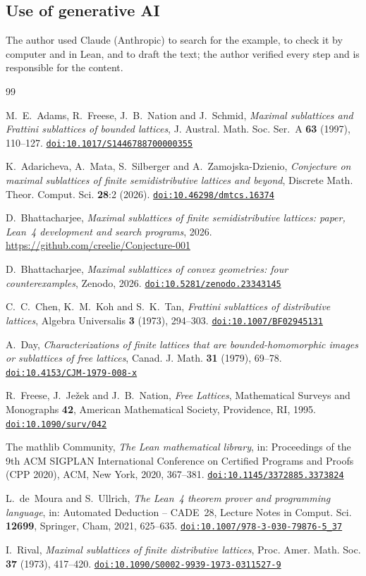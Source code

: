 \documentclass[11pt]{amsart}
\theoremstyle{definition}
\theoremstyle{remark}
\numberwithin{equation}{section}
\newcommand{\doi}[1]{\href{https://doi.org/#1}{\nolinkurl{doi:#1}}}
\begin{document}
\subsection*{Use of generative AI}
The author used Claude (Anthropic) to search for the example, to check it by computer and in Lean, and to draft the text; the author verified every step and is responsible for the content.

\begin{thebibliography}{99}

M.~E.~Adams, R.~Freese, J.~B.~Nation and J.~Schmid, \emph{Maximal sublattices and Frattini sublattices of bounded lattices}, J. Austral. Math. Soc. Ser.~A \textbf{63} (1997), 110--127. \doi{10.1017/S1446788700000355}

K.~Adaricheva, A.~Mata, S.~Silberger and A.~Zamojska-Dzienio, \emph{Conjecture on maximal sublattices of finite semidistributive lattices and beyond}, Discrete Math. Theor. Comput. Sci. \textbf{28}:2 (2026). \doi{10.46298/dmtcs.16374}

D.~Bhattacharjee, \emph{Maximal sublattices of finite semidistributive lattices: paper, Lean~4 development and search programs}, 2026. \url{https://github.com/creelie/Conjecture-001}

D.~Bhattacharjee, \emph{Maximal sublattices of convex geometries: four counterexamples}, Zenodo, 2026. \doi{10.5281/zenodo.23343145}

C.~C.~Chen, K.~M.~Koh and S.~K.~Tan, \emph{Frattini sublattices of distributive lattices}, Algebra Universalis \textbf{3} (1973), 294--303. \doi{10.1007/BF02945131}

A.~Day, \emph{Characterizations of finite lattices that are bounded-homomorphic images or sublattices of free lattices}, Canad. J. Math. \textbf{31} (1979), 69--78. \doi{10.4153/CJM-1979-008-x}

R.~Freese, J.~Je\v{z}ek and J.~B.~Nation, \emph{Free Lattices}, Mathematical Surveys and Monographs \textbf{42}, American Mathematical Society, Providence, RI, 1995. \doi{10.1090/surv/042}

The mathlib Community, \emph{The Lean mathematical library}, in: Proceedings of the 9th ACM SIGPLAN International Conference on Certified Programs and Proofs (CPP 2020), ACM, New York, 2020, 367--381. \doi{10.1145/3372885.3373824}

L.~de~Moura and S.~Ullrich, \emph{The Lean~4 theorem prover and programming language}, in: Automated Deduction -- CADE~28, Lecture Notes in Comput. Sci. \textbf{12699}, Springer, Cham, 2021, 625--635. \doi{10.1007/978-3-030-79876-5_37}

I.~Rival, \emph{Maximal sublattices of finite distributive lattices}, Proc. Amer. Math. Soc. \textbf{37} (1973), 417--420. \doi{10.1090/S0002-9939-1973-0311527-9}

\end{thebibliography}
\end{document}
